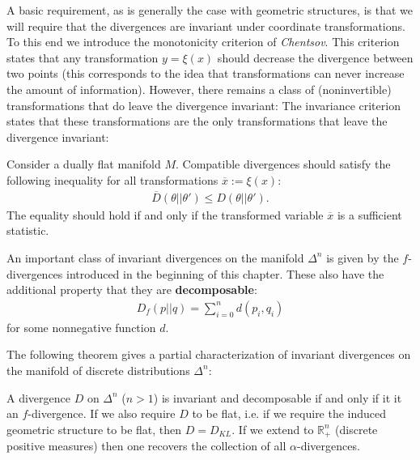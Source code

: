     A basic requirement, as is generally the case with geometric structures, is that we will require that the divergences are invariant under coordinate transformations. To this end we introduce the monotonicity criterion of \textit{Chentsov}. This criterion states that any transformation $y=\xi(x)$ should decrease the divergence between two points (this corresponds to the idea that transformations can never increase the amount of information). However, there remains a class of (noninvertible) transformations that do leave the divergence invariant:
    The invariance criterion states that these transformations are the only transformations that leave the divergence invariant:
    \begin{axiom}
        Consider a dually flat manifold $M$. Compatible divergences should satisfy the following inequality for all transformations $\overline{x}:=\xi(x)$:
        \begin{gather}
            \overline{D}(\theta||\theta')\leq D(\theta||\theta').
        \end{gather}
        The equality should hold if and only if the transformed variable $\overline{x}$ is a sufficient statistic.
    \end{axiom}

    \begin{example}[$f$-divergences]
        An important class of invariant divergences on the manifold $\Delta^n$ is given by the $f$-divergences introduced in the beginning of this chapter. These also have the additional property that they are \textbf{decomposable}:
        \begin{gather}
            D_f(p||q) = \sum_{i=0}^n d(p_i, q_i)
        \end{gather}
        for some nonnegative function $d$.
    \end{example}
    The following theorem gives a partial characterization of invariant divergences on the manifold of discrete distributions $\Delta^n$:
    \begin{property}
        A divergence $D$ on $\Delta^n$ ($n>1$) is invariant and decomposable if and only if it it an $f$-divergence. If we also require $D$ to be flat, i.e. if we require the induced geometric structure to be flat, then $D = D_{KL}$. If we extend to $\mathbb{R}^n_+$ (discrete positive measures) then one recovers the collection of all $\alpha$-divergences.
    \end{property}

